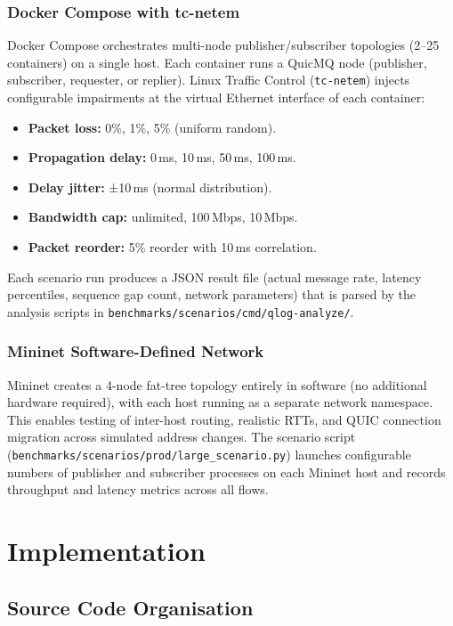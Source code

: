 \documentclass[12pt, a4paper, oneside]{report}
\begin{document}
\subsection{Docker Compose with tc-netem}
Docker Compose orchestrates multi-node publisher/subscriber topologies (2–25 containers) on a single host. Each container runs a QuicMQ node (publisher, subscriber, requester, or replier). Linux Traffic Control (\texttt{tc-netem}) injects configurable impairments at the virtual Ethernet interface of each container:
\begin{itemize}
  \item \textbf{Packet loss:} 0\%, 1\%, 5\% (uniform random).
  \item \textbf{Propagation delay:} 0\,ms, 10\,ms, 50\,ms, 100\,ms.
  \item \textbf{Delay jitter:} ±10\,ms (normal distribution).
  \item \textbf{Bandwidth cap:} unlimited, 100\,Mbps, 10\,Mbps.
  \item \textbf{Packet reorder:} 5\% reorder with 10\,ms correlation.
\end{itemize}
Each scenario run produces a JSON result file (actual message rate, latency percentiles, sequence gap count, network parameters) that is parsed by the analysis scripts in \texttt{benchmarks/scenarios/cmd/qlog-analyze/}.

\subsection{Mininet Software-Defined Network}
Mininet creates a 4-node fat-tree topology entirely in software (no additional hardware required), with each host running as a separate network namespace. This enables testing of inter-host routing, realistic RTTs, and QUIC connection migration across simulated address changes. The scenario script (\texttt{benchmarks/scenarios/prod/large\_scenario.py}) launches configurable numbers of publisher and subscriber processes on each Mininet host and records throughput and latency metrics across all flows.

\chapter{Implementation}
\label{ch:impl}

\section{Source Code Organisation}
\label{sec:src-org}
\end{document}
